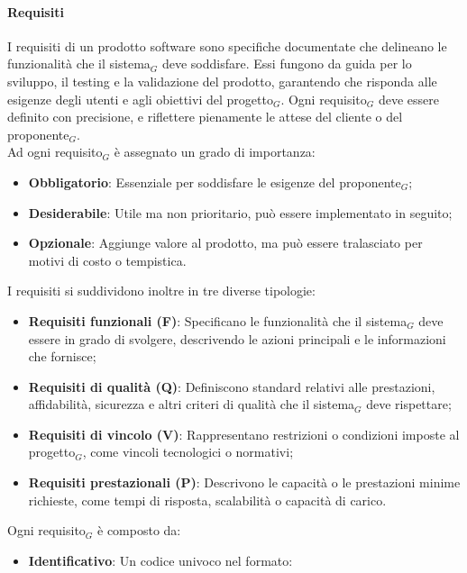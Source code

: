 \documentclass[10pt]{article}
\begin{document}
\begin{justify}
        \paragraph{Requisiti}
        I requisiti di un prodotto software sono specifiche documentate che delineano le funzionalità che il sistema$_G$ deve soddisfare. Essi fungono da guida per lo sviluppo, il testing e la validazione del prodotto, garantendo che risponda alle esigenze degli utenti e agli obiettivi del progetto$_G$. Ogni requisito$_G$ deve essere definito con precisione, e riflettere pienamente le attese del cliente o del proponente$_G$.\\
        Ad ogni requisito$_G$ è assegnato un grado di importanza:
        \begin{itemize}
            \item \textbf{Obbligatorio}: Essenziale per soddisfare le esigenze del proponente$_G$;
            \item \textbf{Desiderabile}: Utile ma non prioritario, può essere implementato in seguito;
            \item \textbf{Opzionale}: Aggiunge valore al prodotto, ma può essere tralasciato per motivi di costo o tempistica.
        \end{itemize}
        I requisiti si suddividono inoltre in tre diverse tipologie:
        \begin{itemize}
            \item \textbf{Requisiti funzionali (F)}: Specificano le funzionalità che il sistema$_G$ deve essere in grado di svolgere, descrivendo le azioni principali e le informazioni che fornisce;
            \item \textbf{Requisiti di qualità (Q)}: Definiscono standard relativi alle prestazioni, affidabilità, sicurezza e altri criteri di qualità che il sistema$_G$ deve rispettare;
            \item \textbf{Requisiti di vincolo (V)}: Rappresentano restrizioni o condizioni imposte al progetto$_G$, come vincoli tecnologici o normativi;
            \item \textbf{Requisiti prestazionali (P)}: Descrivono le capacità o le prestazioni minime richieste, come tempi di risposta, scalabilità o capacità di carico.
        \end{itemize}
        Ogni requisito$_G$ è composto da:
        \begin{itemize}
            \item \textbf{Identificativo}: Un codice univoco nel formato:
            \begin{quote}

\end{quote}
\end{itemize}
\end{justify}
\end{document}
